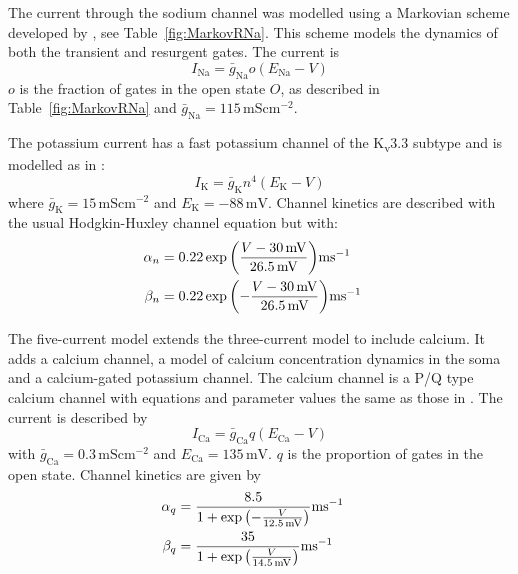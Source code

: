 \documentclass[twocolumn]{svjour3}          %
\newcommand{\mv}{\,\mathrm{mV}}
\newcommand{\msi}{\,\mathrm{mS cm^{-2}}}
\renewcommand{\k}{\mathrm{K}}
\newcommand{\ca}{\mathrm{Ca}}
\newcommand{\na}{\mathrm{Na}}
\begin{document}
The current through the sodium channel was modelled using a Markovian scheme developed by \citet{RamanBean2001}, see
Table~\ref{fig:MarkovRNa}. This scheme models the dynamics of both the transient and resurgent gates. The current is
\begin{equation}
\label{eq:I_RNa}
I_{\na} = \bar{g}_\na o (E_\na-V)
\end{equation}
$o$ is the fraction of gates in the open state $O$, as described in Table~\ref{fig:MarkovRNa} and $\bar{g}_\na=115\msi$.


The potassium current has a fast potassium channel of the K\textsubscript{v}3.3 subtype and is modelled as in
\citet{MasoliEtAl2015}:
\begin{equation}
\label{eq:I_K}
I_{\k} = \bar{g}_{\k} n^4(E_{\k}-V)
\end{equation}
where $\bar{g}_{\k}= 15\msi$ and $E_{\k}=-88\mv$. Channel kinetics are described with the usual Hodgkin-Huxley channel equation but with:
\begin{align}
\label{eq:n_kinetics}
\alpha_{n} &= 0.22
\exp{\left(\frac{V-30\mv}{26.5\mv}\right)}\mathrm{ms}^{-1}\cr 
\beta_{n} &= 0.22
\exp{\left(-\frac{V-30\mv}{26.5\mv}\right)}\mathrm{ms}^{-1}
\end{align}

The five-current model extends the three-current model to include
calcium. It adds a calcium channel, a model of calcium concentration
dynamics in the soma and a calcium-gated potassium channel. The
calcium channel is a P/Q type calcium channel with equations and
parameter values the same as those in \citet{MiyashoEtAl2001}. The
current is described by
\begin{equation}
\label{eq:I_Ca}
I_\ca =\bar{g}_{\ca} q(E_\ca-V)
\end{equation}
with $\bar{g}_\ca= 0.3\msi$ and $E_\ca = 135\mv$. $q$ is the proportion of gates in the open state. Channel kinetics are given by
\begin{align}
\label{eq:q_kinetics}
\alpha_{q} &= \frac{8.5}{ 1 +
  \exp{\left(-\frac{V}{12.5\mv}\right)}}\mathrm{ms}^{-1}\cr \beta_{q} &=
\frac{35}{ 1 + \exp{\left(\frac{V}{14.5\mv}\right)}}\mathrm{ms}^{-1}
\end{align}

\end{document}

